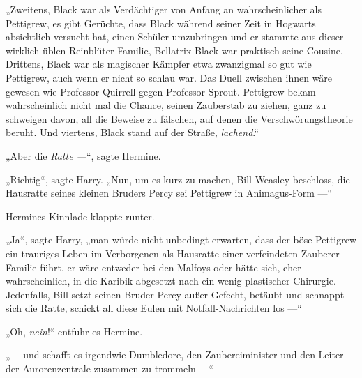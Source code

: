 „Zweitens, Black war als Verdächtiger von Anfang an wahrscheinlicher als Pettigrew, es gibt Gerüchte, dass Black während seiner Zeit in Hogwarts absichtlich versucht hat, einen Schüler umzubringen und er stammte aus dieser wirklich üblen Reinblüter-Familie, Bellatrix Black war praktisch seine Cousine. Drittens, Black war als magischer Kämpfer etwa zwanzigmal so gut wie Pettigrew, auch wenn er nicht so schlau war. Das Duell zwischen ihnen wäre gewesen wie Professor Quirrell gegen Professor Sprout. Pettigrew bekam wahrscheinlich nicht mal die Chance, seinen Zauberstab zu ziehen, ganz zu schweigen davon, all die Beweise zu fälschen, auf denen die Verschwörungstheorie beruht. Und viertens, Black stand auf der Straße, \emph{lachend}.“

„Aber die \emph{Ratte —}“, sagte Hermine.

„Richtig“, sagte Harry.
„Nun, um es kurz zu machen, Bill Weasley beschloss, die Hausratte seines kleinen Bruders Percy sei Pettigrew in Animagus-Form —“

Hermines Kinnlade klappte runter.

„Ja“, sagte Harry, „man würde nicht unbedingt erwarten, dass der böse Pettigrew ein trauriges Leben im Verborgenen als Hausratte einer verfeindeten Zauberer-Familie führt, er wäre entweder bei den Malfoys oder hätte sich, eher wahrscheinlich, in die Karibik abgesetzt nach ein wenig plastischer Chirurgie. Jedenfalls, Bill setzt seinen Bruder Percy außer Gefecht, betäubt und schnappt sich die Ratte, schickt all diese Eulen mit Notfall-Nachrichten los —“

„Oh, \emph{nein}!“ entfuhr es Hermine.

„— und schafft es irgendwie Dumbledore, den Zaubereiminister und den Leiter der Aurorenzentrale zusammen zu trommeln —“

